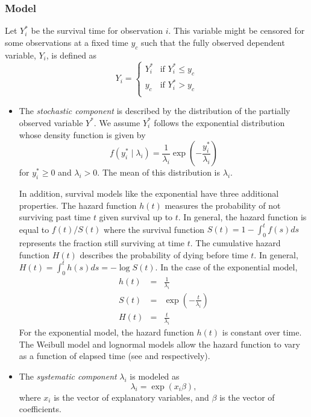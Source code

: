 \subsubsection{Model}

Let $Y_i^*$ be the survival time for observation $i$. This variable
might be censored for some observations at a fixed time $y_c$ such
that the fully observed dependent variable, $Y_i$, is defined as
\begin{equation*}
  Y_i = \left\{ \begin{array}{ll}
      Y_i^* & \textrm{if }Y_i^* \leq y_c \\
      y_c & \textrm{if }Y_i^* > y_c \\
    \end{array} \right.
\end{equation*}

\begin{itemize}
\item The \emph{stochastic component} is described by the distribution
  of the partially observed variable $Y^*$.  We assume $Y_i^*$ follows
  the exponential distribution whose density function is given by
  \begin{equation*}
    f(y_i^*\mid \lambda_i) = \frac{1}{\lambda_i} \exp\left(-\frac{y_i^*}{\lambda_i}\right)
  \end{equation*}
  for $y_i^*\ge 0$ and $\lambda_i>0$. The mean of this distribution is
  $\lambda_i$.  

  In addition, survival models like the exponential have three
  additional properties.  The hazard function $h(t)$ measures the
  probability of not surviving past time $t$ given survival up to
  $t$. In general, the hazard function is equal to $f(t)/S(t)$ where
  the survival function $S(t) = 1 - \int_{0}^t f(s) ds$ represents the
  fraction still surviving at time $t$.  The cumulative hazard
  function $H(t)$ describes the probability of dying before time $t$.
  In general, $H(t)= \int_{0}^{t} h(s) ds = -\log S(t)$.  In the case
  of the exponential model,
\begin{eqnarray*}
h(t) &=& \frac{1}{\lambda_i} \\
S(t) &=& \exp\left( -\frac{t}{\lambda_i} \right) \\
H(t) &=& \frac{t}{\lambda_i}
\end{eqnarray*}
For the exponential model, the hazard function $h(t)$ is constant over
time.  The Weibull model and lognormal models allow the hazard
function to vary as a function of elapsed time (see  and
 respectively).
  
\item The \emph{systematic component} $\lambda_i$ is modeled as
  \begin{equation*}
    \lambda_i = \exp(x_i \beta),
  \end{equation*}
  where $x_i$ is the vector of explanatory variables, and $\beta$ is
  the vector of coefficients.
\end{itemize}  


